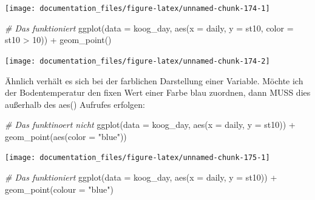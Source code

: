 \documentclass[
]{article}
\newenvironment{Shaded}{\begin{snugshade}}{\end{snugshade}}
\newcommand{\AttributeTok}[1]{\textcolor[rgb]{0.77,0.63,0.00}{#1}}
\newcommand{\CommentTok}[1]{\textcolor[rgb]{0.56,0.35,0.01}{\textit{#1}}}
\newcommand{\DecValTok}[1]{\textcolor[rgb]{0.00,0.00,0.81}{#1}}
\newcommand{\FunctionTok}[1]{\textcolor[rgb]{0.00,0.00,0.00}{#1}}
\newcommand{\NormalTok}[1]{#1}
\newcommand{\SpecialCharTok}[1]{\textcolor[rgb]{0.00,0.00,0.00}{#1}}
\newcommand{\StringTok}[1]{\textcolor[rgb]{0.31,0.60,0.02}{#1}}
\begin{document}
\begin{center}\texttt{[image: documentation\_files/figure-latex/unnamed-chunk-174-1]} \end{center}

\begin{Shaded}
\begin{Highlighting}[]
\CommentTok{\# Das funktioniert}
\FunctionTok{ggplot}\NormalTok{(}\AttributeTok{data =}\NormalTok{ koog\_day, }\FunctionTok{aes}\NormalTok{(}\AttributeTok{x =}\NormalTok{ daily, }\AttributeTok{y =}\NormalTok{ st10, }\AttributeTok{color =}\NormalTok{ st10 }\SpecialCharTok{\textgreater{}} \DecValTok{10}\NormalTok{)) }\SpecialCharTok{+}
  \FunctionTok{geom\_point}\NormalTok{()}
\end{Highlighting}
\end{Shaded}

\begin{center}\texttt{[image: documentation\_files/figure-latex/unnamed-chunk-174-2]} \end{center}

Ähnlich verhält es sich bei der farblichen Darstellung einer Variable. Möchte ich der Bodentemperatur den fixen Wert einer Farbe blau zuordnen, dann MUSS dies außerhalb des aes() Aufrufes erfolgen:

\begin{Shaded}
\begin{Highlighting}[]
\CommentTok{\# Das funktinoert nicht}
\FunctionTok{ggplot}\NormalTok{(}\AttributeTok{data =}\NormalTok{ koog\_day, }\FunctionTok{aes}\NormalTok{(}\AttributeTok{x =}\NormalTok{ daily, }\AttributeTok{y =}\NormalTok{ st10)) }\SpecialCharTok{+}
  \FunctionTok{geom\_point}\NormalTok{(}\FunctionTok{aes}\NormalTok{(}\AttributeTok{color =} \StringTok{"blue"}\NormalTok{))}
\end{Highlighting}
\end{Shaded}

\begin{center}\texttt{[image: documentation\_files/figure-latex/unnamed-chunk-175-1]} \end{center}

\begin{Shaded}
\begin{Highlighting}[]
\CommentTok{\# Das funktioniert}
\FunctionTok{ggplot}\NormalTok{(}\AttributeTok{data =}\NormalTok{ koog\_day, }\FunctionTok{aes}\NormalTok{(}\AttributeTok{x =}\NormalTok{ daily, }\AttributeTok{y =}\NormalTok{ st10)) }\SpecialCharTok{+}
  \FunctionTok{geom\_point}\NormalTok{(}\AttributeTok{colour =} \StringTok{"blue"}\NormalTok{)}
\end{Highlighting}
\end{Shaded}
\end{document}
